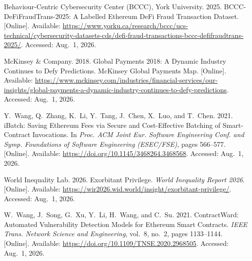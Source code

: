 {\begin{enumerate}[label={[\arabic*]}]
\item Behaviour-Centric Cybersecurity Center (BCCC), York University. 2025. BCCC-DeFiFraudTrans-2025: A Labelled Ethereum DeFi Fraud Transaction Dataset. [Online]. Available: \url{https://www.yorku.ca/research/bccc/ucs-technical/cybersecurity-datasets-cds/defi-fraud-transactions-bccc-defifraudtrans-2025/}. Accessed: Aug.~1, 2026.


\item McKinsey \& Company. 2018. Global Payments 2018: A Dynamic Industry Continues to Defy Predictions. McKinsey Global Payments Map. [Online]. Available: \url{https://www.mckinsey.com/industries/financial-services/our-insights/global-payments-a-dynamic-industry-continues-to-defy-predictions}. Accessed: Aug.~1, 2026.

\item Y.~Wang, Q.~Zhang, K.~Li, Y.~Tang, J.~Chen, X.~Luo, and T.~Chen. 2021. iBatch: Saving Ethereum Fees via Secure and Cost-Effective Batching of Smart-Contract Invocations. In \emph{Proc. ACM Joint Eur. Software Engineering Conf. and Symp. Foundations of Software Engineering (ESEC/FSE)}, pages 566--577. [Online]. Available: \url{https://doi.org/10.1145/3468264.3468568}. Accessed: Aug.~1, 2026.

\item World Inequality Lab. 2026. Exorbitant Privilege. \emph{World Inequality Report 2026}. [Online]. Available: \url{https://wir2026.wid.world/insight/exorbitant-privilege/}. Accessed: Aug.~1, 2026.


\item W.~Wang, J.~Song, G.~Xu, Y.~Li, H.~Wang, and C.~Su. 2021. ContractWard: Automated Vulnerability Detection Models for Ethereum Smart Contracts. \emph{IEEE Trans. Network Science and Engineering}, vol.~8, no.~2, pages 1133--1144. [Online]. Available: \url{https://doi.org/10.1109/TNSE.2020.2968505}. Accessed: Aug.~1, 2026.


\end{enumerate}}
